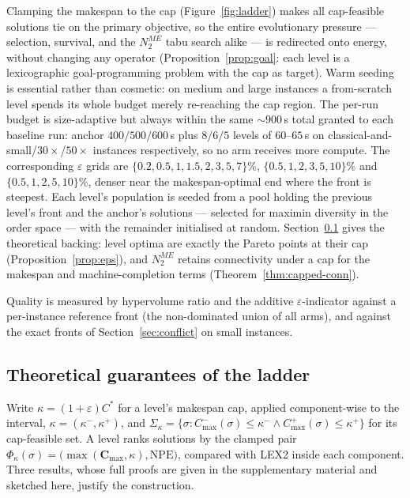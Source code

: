 \documentclass[preprint,12pt]{elsarticle}
\newcommand{\NPE}{\mathrm{NPE}}
\begin{document}
Clamping the makespan to the cap (Figure~\ref{fig:ladder}) makes all
cap-feasible solutions tie on
the primary objective, so the entire evolutionary pressure --- selection,
survival, and the $N_2^{ME}$ tabu search alike --- is redirected onto
energy, without changing any operator (Proposition~\ref{prop:goal}: each
level is a lexicographic goal-programming problem with the cap as target).
Warm seeding is essential rather than cosmetic: on medium and large
instances a from-scratch level spends its whole budget merely re-reaching
the cap region. The per-run budget is size-adaptive but always within the
same ${\sim}900$\,s total granted to each baseline run: anchor
$400/500/600$\,s plus $8/6/5$ levels of $60$--$65$\,s on
classical-and-small/$30{\times}$/$50{\times}$ instances respectively, so no
arm receives more compute. The corresponding $\varepsilon$ grids are
$\{0.2,0.5,1,1.5,2,3,5,7\}\%$, $\{0.5,1,2,3,5,10\}\%$ and
$\{0.5,1,2,5,10\}\%$, denser near the makespan-optimal end where the front
is steepest. Each level's population is seeded from a pool holding the
previous level's front and the anchor's solutions --- selected for maximin
diversity in the order space --- with the remainder initialised at random.
Section~\ref{sec:ladder} gives the theoretical
backing:
level optima are exactly the Pareto points at their cap
(Proposition~\ref{prop:eps}), and $N_2^{ME}$ retains connectivity under a
cap for the makespan and machine-completion terms (Theorem~\ref{thm:capped-conn}).

Quality is measured by hypervolume ratio and the additive
$\varepsilon$-indicator against a per-instance reference front (the
non-dominated union of all arms), and against the exact fronts of
Section~\ref{sec:conflict} on small instances.

\subsection{Theoretical guarantees of the ladder}
\label{sec:ladder}

Write $\kappa=(1+\varepsilon)C^{*}$ for a level's makespan cap, applied
component-wise to the interval, $\kappa=(\kappa^-,\kappa^+)$, and
$\Sigma_\kappa=\{\sigma: C^-_{\max}(\sigma)\le\kappa^-\wedge
C^+_{\max}(\sigma)\le\kappa^+\}$ for its cap-feasible set. A level ranks
solutions by the clamped pair
$\Phi_\kappa(\sigma)=\bigl(\max(\mathbf{C}_{\max},\kappa),\mathbf{\NPE}\bigr)$,
compared with LEX2 inside each component. Three results, whose full proofs are
given in the supplementary material and sketched here, justify the
construction.
\end{document}
